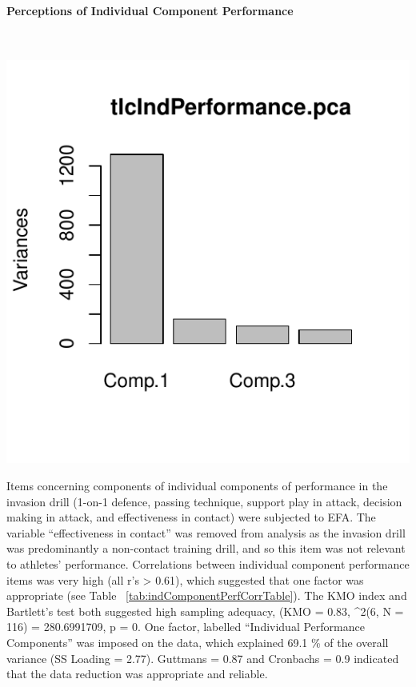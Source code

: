\documentclass[english]{article}\usepackage[]{graphicx}\usepackage[]{color}
\makeatletter
\def\maxwidth{ %
  \ifdim\Gin@nat@width>\linewidth
    \linewidth
  \else
    \Gin@nat@width
  \fi
}
\newenvironment{knitrout}{}{} %
\newcommand{\myparagraph}[1]{\paragraph{#1}\mbox{}\\}
\makeatother
\begin{document}
\myparagraph{Perceptions of Individual Component Performance}
\begin{knitrout}
\color{fgcolor}

{\centering \includegraphics[width=\maxwidth]{figure/dataReductionIndPerformance-1} 

}



\end{knitrout}

Items concerning components of individual components of performance in the invasion drill (1-on-1 defence, passing technique, support play in attack, decision making in attack, and effectiveness in contact) were subjected to EFA.  The variable ``effectiveness in contact'' was removed from analysis as the invasion drill was predominantly a non-contact training drill, and so this item was not relevant to athletes' performance.  Correlations between individual component performance items was very high (all r's > 0.61), which suggested that one factor was appropriate (see Table ~\ref{tab:indComponentPerfCorrTable}). 
The KMO index and Bartlett's test both suggested high sampling adequacy, (KMO =  0.83, \chi^2(6, N = 116) = 280.6991709, p = 0. One factor, labelled ``Individual Performance Components'' was imposed on the data, which explained 69.1 \% of the overall variance (SS Loading = 2.77).  Guttmans \lambda = 0.87  and  Cronbachs \alpha = 0.9  indicated that the data reduction was appropriate and reliable.
\end{document}
